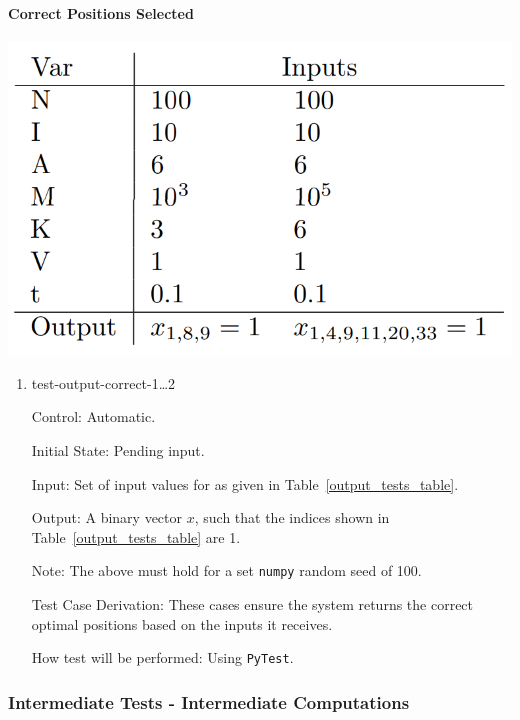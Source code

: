 \documentclass[12pt, titlepage]{article}
\begin{document}
\paragraph{Correct Positions Selected}
\begin{center}
  \includegraphics[scale=0.4]{OutputTable.PNG} \\
  \label{output_tests_table}
\end{center}

\begin{enumerate}

  \item{test-output-correct-1\dots2\\}
  
  Control: Automatic.
            
  Initial State: Pending input.
            
  Input: Set of input values for as given in Table~\ref{output_tests_table}.
            
  Output: A binary vector $x$, such that the indices shown in Table~\ref{output_tests_table} are 1.

  Note: The above must hold for a set \texttt{numpy} random seed of 100. 
  
  Test Case Derivation: These cases ensure the system returns the correct optimal positions based on the inputs it receives. 
            
  How test will be performed: Using \texttt{PyTest}. 
\end{enumerate}

\subsubsection{Intermediate Tests - Intermediate Computations} \label{svd_test}
\end{document}
